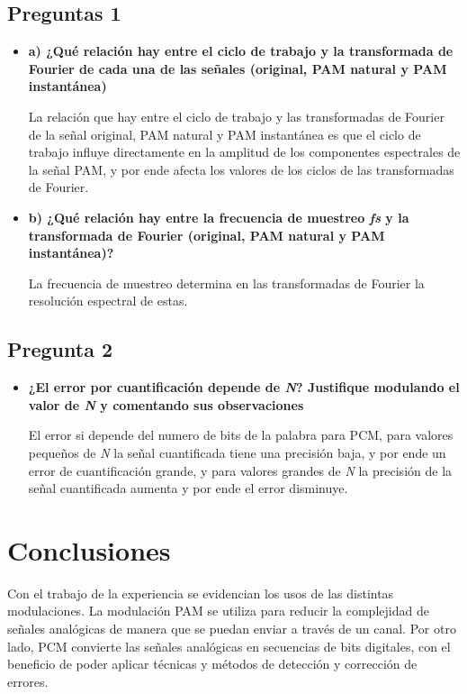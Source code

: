 \documentclass[letter,12pt]{article}
\begin{document}
\subsection{Preguntas 1}
\begin{itemize}
    \item  \textbf{a) ¿Qué relación hay entre el ciclo de trabajo y la transformada de Fourier de cada una de las señales (original, PAM natural y PAM instantánea)}
    
    La relación que hay entre el ciclo de trabajo y las transformadas de Fourier de la señal original, PAM natural y PAM instantánea es que el ciclo de trabajo influye directamente en la amplitud de los componentes espectrales de la señal PAM, y por ende afecta los valores de los ciclos de las transformadas de Fourier.

    \item \textbf{b) ¿Qué relación hay entre la frecuencia de muestreo \textit{fs} y la transformada de Fourier (original, PAM natural y PAM instantánea)?}

    La frecuencia de muestreo determina en las transformadas de Fourier la resolución espectral de estas.
    
\end{itemize}

\subsection{Pregunta 2}
\begin{itemize}
    \item \textbf{¿El error por cuantificación depende de \textit{N}? Justifique modulando el valor de \textit{N} y comentando sus observaciones}

    El error si depende del numero de bits de la palabra para PCM, para valores pequeños de \textit{N} la señal cuantificada tiene una precisión baja, y por ende un error de cuantificación grande, y para valores grandes de \textit{N} la precisión de la señal cuantificada aumenta y por ende el error disminuye.
\end{itemize}
\section{Conclusiones}
Con el trabajo de la experiencia se evidencian los usos de las distintas modulaciones. La modulación PAM se utiliza para reducir la complejidad de señales analógicas de manera que se puedan enviar a través de un canal. Por otro lado, PCM convierte las señales analógicas en secuencias de bits digitales, con el beneficio de poder aplicar técnicas y métodos de detección y corrección de errores.
\end{document}
